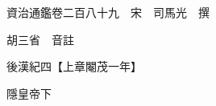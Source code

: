 










 


 
 


 

  
  
  
  
  





  
  
  
  
  
 
  

  

  
  
  



  

 
 

  
   




  

  
  


  　　資治通鑑卷二百八十九　宋　司馬光　撰

　　胡三省　音註

　　後漢紀四【上章閹茂一年】

　　隱皇帝下

